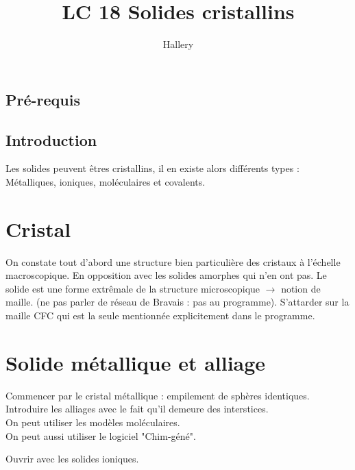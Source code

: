 \documentclass[12pt,prb,aps,epsf]{article}
\begin{document}
	
	\title{LC 18 Solides cristallins}
	\author{Hallery}
	
	\maketitle
	
	\tableofcontents
	
	\pagebreak
	
	
\subsection{Pré-requis}

\subsection{Introduction}
Les solides peuvent êtres cristallins, il en existe alors différents types : Métalliques, ioniques, moléculaires et covalents.


\section{Cristal}
On constate tout d'abord une structure bien particulière des cristaux à l'échelle macroscopique. En opposition avec les solides amorphes qui n'en ont pas. Le solide est une forme extrêmale de la structure microscopique $\rightarrow$ notion de maille. (ne pas parler de réseau de Bravais : pas au programme). S'attarder sur la maille CFC qui est la seule mentionnée explicitement dans le programme.

\section{Solide métallique et alliage}

Commencer par le cristal métallique : empilement de sphères identiques. Introduire les alliages avec le fait qu'il demeure des interstices.\\
On peut utiliser les modèles moléculaires.\\
On peut aussi utiliser le logiciel "Chim-géné".
	
Ouvrir avec les solides ioniques.
\end{document}
